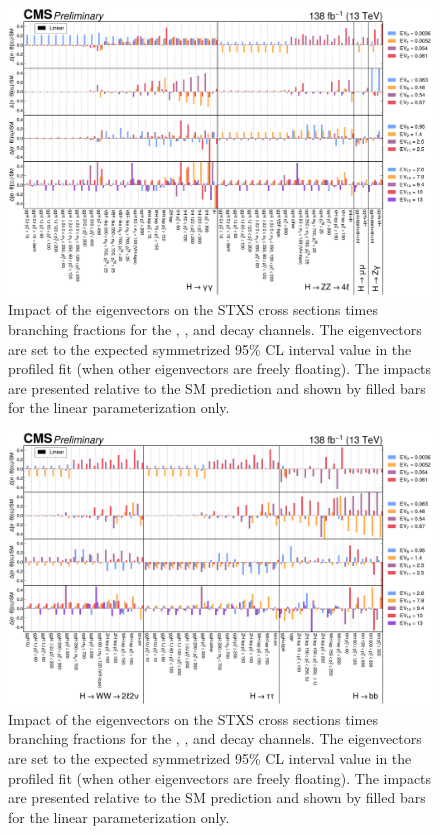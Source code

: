 \begin{landscape}
  \begin{figure}
      \centering
      \includegraphics[width=.9\linewidth]{Figures/EFT/HIG-21-018-Figure_019.pdf}
      \caption[Impact of SMEFT Operators in the Rotated Basis (1)]{Impact of the eigenvectors on the STXS cross sections times branching fractions for the \Hgg, \Hfl, \Hmumu and \HZg decay channels. The eigenvectors are set to the expected symmetrized 95\% CL interval value in the profiled fit (when other eigenvectors are freely floating). The impacts are presented relative to the SM prediction and shown by filled bars for the linear parameterization only.}\label{fig:smeft_parametrisation_rotated_linear_part1}
  \end{figure}
\end{landscape}

\begin{landscape}
  \begin{figure}
      \centering
      \includegraphics[width=.9\linewidth]{Figures/EFT/HIG-21-018-Figure_020.pdf}
      \caption[Impact of SMEFT Operators in the Rotated Basis (2)]{Impact of the eigenvectors on the STXS cross sections times branching fractions for the \Hlnulnu, \Htautau, and \Hbb decay channels. The eigenvectors are set to the expected symmetrized 95\% CL interval value in the profiled fit (when other eigenvectors are freely floating). The impacts are presented relative to the SM prediction and shown by filled bars for the linear parameterization only.}\label{fig:smeft_parametrisation_rotated_linear_part2}
  \end{figure}
\end{landscape}

